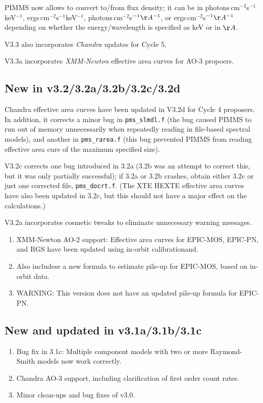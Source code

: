 \documentclass[11pt]{article}
\begin{document}
\begin{appendices}
PIMMS now allows to convert to/from flux density; it can be in
photons\,cm$^{-2}$s$^{-1}$keV$^{-1}$, ergs\,cm$^{-2}$s$^{-1}$keV$^{-1}$,
photons\,cm$^{-2}$s$^{-1} \AA^{-1}$, or ergs\,cm$^{-2}$s$^{-1} \AA^{-1}$
depending on whether the energy/wavelength is specified as keV or in
$\AA$.

V3.3 also incorporates {\sl Chandra\/} updates for Cycle 5.

V3.3a incorporates {\sl XMM-Newton\/} effective area curves for
AO-3 propoers.

\subsection{New in v3.2/3.2a/3.2b/3.2c/3.2d}

Chandra effective area curves have been updated in V3.2d
for Cycle 4 proposers.  In addition, it corrects a minor
bug in {\tt pms\_slmdl.f} (the bug caused PIMMS to run out
of memory unnecessarily when repeatedly reading in file-based
spectral models), and another in {\tt pms\_rarea.f} (this bug
prevented PIMMS from reading effective area cure of the maximum
specified size).

V3.2c corrects one bug introduced in 3.2a (3.2b was an attempt
to correct this, but it was only partially successful); if 3.2a
or 3.2b crashes, obtain either 3.2c or just one corrected file,
{\tt pms\_docrt.f}.  (The XTE HEXTE effective area curves have
also been updated in 3.2c, but this should not have a major effect
on the calculations.)

V3.2a incorporates cosmetic tweaks to eliminate unnecessary warning
messages.

\begin{enumerate}
\item XMM-Newton AO-2 support: Effective area curves for EPIC-MOS, EPIC-PN,
	and RGS have been updated using in-orbit calibrationand.
\item Also includese a new formula to estimate pile-up for EPIC-MOS,
	based on in-orbit data.
\item WARNING: This version does not have an updated pile-up formula for
	EPIC-PN.
\end{enumerate}

\subsection{New and updated in v3.1a/3.1b/3.1c}

\begin{enumerate}
\item Bug fix in 3.1c: Multiple component models with two or more
	Raymond-Smith models now work correctly.
\item Chandra AO-3 support, including clarification of first order count rates.
\item Minor clean-ups and bug fixes of v3.0.
\end{enumerate}


\end{appendices}
\end{document}
